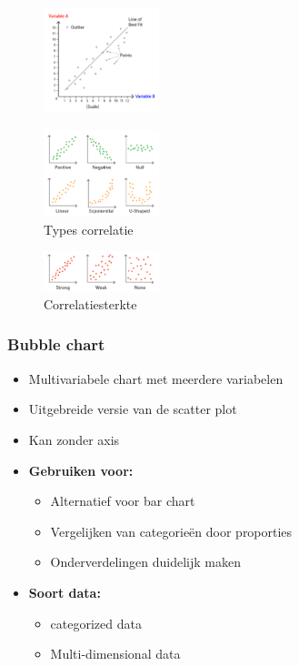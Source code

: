 \documentclass{article}
\newcommand{\bold}[1]{\textbf{#1}}
\begin{document}
\begin{figure}[H]
    \centering
    \includegraphics[width=0.3\textwidth]{dv-scatter1.png}
    \caption{}
\end{figure}
\begin{figure}[H]
    \centering
    \includegraphics[width=0.3\textwidth]{dv-scatter2.png}
    \caption{Types correlatie}
\end{figure}
\begin{figure}[H]
    \centering
    \includegraphics[width=0.3\textwidth]{dv-scatter3.png}
    \caption{Correlatiesterkte}
\end{figure}

\subsubsection{Bubble chart}

\begin{itemize}
    \item Multivariabele chart met meerdere variabelen
    \item Uitgebreide versie van de scatter plot
    \item Kan zonder axis
    \item \bold{Gebruiken voor:}
    \begin{itemize}
        \item Alternatief voor bar chart
        \item Vergelijken van categorieën door proporties
        \item Onderverdelingen duidelijk maken
    \end{itemize}
    \item \bold{Soort data:}
    \begin{itemize}
        \item categorized data
        \item Multi-dimensional data
    \end{itemize}
\end{itemize}
\end{document}
